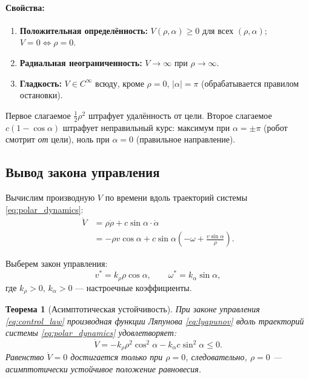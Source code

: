 \documentclass[12pt, a4paper]{article}
\theoremstyle{definition}
\theoremstyle{plain}
\newtheorem{theorem}{Теорема}[section]
\begin{document}
\paragraph{Свойства:}
\begin{enumerate}[nosep]
  \item \textbf{Положительная определённость:} $V(\rho, \alpha) \ge 0$ для всех
        $(\rho, \alpha)$; $V = 0 \Leftrightarrow \rho = 0$.
  \item \textbf{Радиальная неограниченность:} $V \to \infty$ при $\rho \to \infty$.
  \item \textbf{Гладкость:} $V \in C^\infty$ всюду, кроме $\rho = 0$,
        $|\alpha| = \pi$ (обрабатывается правилом остановки).
\end{enumerate}

Первое слагаемое $\tfrac{1}{2}\rho^2$ штрафует удалённость от цели.
Второе слагаемое $c(1 - \cos\alpha)$ штрафует неправильный курс: максимум при
$\alpha = \pm\pi$ (робот смотрит \emph{от} цели), ноль при $\alpha = 0$
(правильное направление).

\subsection{Вывод закона управления}\label{sec:control_derivation}

Вычислим производную $V$ по времени вдоль траекторий системы \eqref{eq:polar_dynamics}:
\begin{align}
  \dot{V} &= \rho\dot{\rho} + c\sin\alpha \cdot \dot{\alpha} \nonumber\\
           &= -\rho v\cos\alpha + c\sin\alpha\!\left(-\omega + \frac{v\sin\alpha}{\rho}\right). \label{eq:Vdot_general}
\end{align}

Выберем закон управления:
\begin{equation}\label{eq:control_law}
  \boxed{v^* = k_\rho \rho \cos\alpha, \qquad
         \omega^* = k_\alpha \sin\alpha,}
\end{equation}
где $k_\rho > 0$, $k_\alpha > 0$ --- настроечные коэффициенты.

\begin{theorem}[Асимптотическая устойчивость]\label{thm:stability}
При законе управления \eqref{eq:control_law} производная функции Ляпунова
\eqref{eq:lyapunov} вдоль траекторий системы \eqref{eq:polar_dynamics}
удовлетворяет:
\begin{equation}\label{eq:Vdot}
  \dot{V} = -k_\rho \rho^2 \cos^2\alpha - k_\alpha c \sin^2\alpha \le 0.
\end{equation}
Равенство $\dot{V} = 0$ достигается только при $\rho = 0$, следовательно,
$\rho = 0$ --- асимптотически устойчивое положение равновесия.
\end{theorem}
\end{document}
